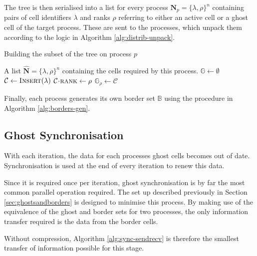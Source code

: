 \documentclass{IIBproject}
\newcommand{\vect}[1]{\bm{#1}}
\newcommand{\acc}{{\mkern 0.5mu\cdot\mkern 0.5mu}}
\begin{document}
The tree is then serialised into a list for every process $\vect{N}_p=\{\lambda,\rho\}^n$ containing pairs of cell identifiers $\lambda$ and ranks $\rho$ referring to either an active cell or a ghost cell of the target process. These are sent to the processes, which unpack them according to the logic in Algorithm \ref{alg:distrib-unpack}.

\begin{algorithm}[H]
\caption{Building the subset of the tree on process $p$}
\label{alg:distrib-unpack}

\begin{algorithmic}
\Require A list $\vect{\hat N}=\{\lambda,\rho\}^n$ containing the cells required by this process.
\Statex
\State $\mathbb{G} \gets \emptyset$ 
\ForEach {packed cell $\{\lambda,\rho\} \in \vect{\hat N}$}
	\State $\mathcal{C} \gets \textproc{Insert}(\lambda)$ 
	\State $\mathcal{C}\acc\textproc{rank} \gets \rho$
	 
		\State $\mathbb{G}_\rho \gets \mathcal{C}$ 
	\EndIf
\EndFor
\end{algorithmic}
\end{algorithm}

Finally, each process generates its own border set $\mathbb{B}$ using the procedure in Algorithm \ref{alg:borders-gen}.


\subsection{Ghost Synchronisation}

With each iteration, the data for each processes ghost cells becomes out of date. Synchronisation is used at the end of every iteration to renew this data. 

Since it is required once per iteration, ghost synchronisation is by far the most common parallel operation required. The set up described previously in Section \ref{sec:ghostsandborders} is designed to minimise this process. By making use of the equivalence of the ghost and border sets for two processes, the only information transfer required is the data from the border cells.

Without compression, Algorithm \ref{alg:sync-sendrecv} is therefore the smallest transfer of information possible for this stage.
\end{document}

